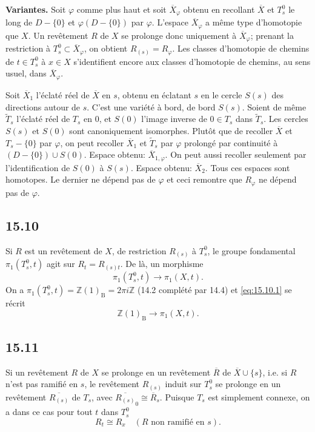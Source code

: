 \documentclass[12pt,a4paper]{article}
\theoremstyle{plain}
\theoremstyle{definition}
\theoremstyle{remark}
\newcommand{\bZ}{\mathbb{Z}}
\newcommand{\B}{\mathrm{B}}
\begin{document}
\textbf{Variantes.} Soit $\varphi$ comme plus haut et soit $\overline{X}_\varphi$ obtenu en recollant $\overline{X}$ et $T_s^0$ le long de $D - \{0\}$ et $\varphi(D - \{0\})$ par $\varphi$. L'espace $\overline{X}_\varphi$ a même type d'homotopie que $X$. Un revêtement $R$ de $X$ se prolonge donc uniquement à $\overline{X}_\varphi$; prenant la restriction à $T_s^0 \subset \overline{X}_\varphi$, on obtient $R_{(s)} = R_\varphi$. Les classes d'homotopie de chemins de $t \in T_s^0$ à $x \in X$ s'identifient encore aux classes d'homotopie de chemins, au sens usuel, dans $\overline{X}_\varphi$.

Soit $\overline{X}_1$ l'éclaté réel de $\overline{X}$ en $s$, obtenu en éclatant $s$ en le cercle $S(s)$ des directions autour de $s$. C'est une variété à bord, de bord $S(s)$. Soient de même $\widetilde{T}_s$ l'éclaté réel de $T_s$ en $0$, et $S(0)$ l'image inverse de $0 \in T_s$ dans $\widetilde{T}_s$. Les cercles $S(s)$ et $S(0)$ sont canoniquement isomorphes. Plutôt que de recoller $\overline{X}$ et $T_s - \{0\}$ par $\varphi$, on peut recoller $\overline{X}_1$ et $\widetilde{T}_s$ par $\varphi$ prolongé par continuité à $(D - \{0\}) \cup S(0)$. Espace obtenu: $\overline{X}_{1,\varphi}$. On peut aussi recoller seulement par l'identification de $S(0)$ à $S(s)$. Espace obtenu: $\overline{X}_2$. Tous ces espaces sont homotopes. Le dernier ne dépend pas de $\varphi$ et ceci remontre que $R_\varphi$ ne dépend pas de $\varphi$.

\subsection*{15.10}

Si $R$ est un revêtement de $X$, de restriction $R_{(s)}$ à $T_s^0$, le groupe fondamental $\pi_1(T_s^0, t)$ agit sur $R_t = R_{(s)t}$. De là, un morphisme
\begin{equation}\label{eq:15.10.1}
\pi_1(T_s^0, t) \to \pi_1(X, t).
\end{equation}
On a $\pi_1(T_s^0, t) = \bZ(1)_{\B} = 2\pi i \bZ$ (14.2 complété par 14.4) et \eqref{eq:15.10.1} se récrit
\begin{equation}\label{eq:15.10.2}
\bZ(1)_{\B} \to \pi_1(X, t).
\end{equation}

\subsection*{15.11}

Si un revêtement $R$ de $X$ se prolonge en un revêtement $\overline{R}$ de $\overline{X} \cup \{s\}$, i.e. si $R$ n'est pas ramifié en $s$, le revêtement $R_{(s)}$ induit sur $T_s^0$ se prolonge en un revêtement $\overline{R_{(s)}}$ de $T_s$, avec $\overline{R_{(s)}}_0 \cong \overline{R}_s$. Puisque $T_s$ est simplement connexe, on a dans ce cas pour tout $t$ dans $T_s^0$
\begin{equation}\label{eq:15.11.1}
R_t \cong R_x \quad (R \text{ non ramifié en } s).
\end{equation}
\end{document}
